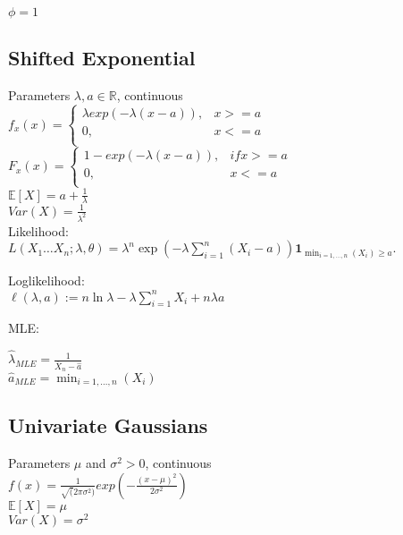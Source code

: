 $\phi = 1$


\subsection*{Shifted Exponential}

Parameters $\lambda, a \in \mathbb{R}$, continuous\\
$ f_x(x)=
	\begin{cases}
		 \lambda exp(-\lambda(x - a )),&{x >= a}\\
		0,&{x <= a}\\
	\end{cases}
$\\

$ F_x(x)=
	\begin{cases}
		 1-exp(-\lambda(x-a)),&{if x >= a}\\
		0,&{x <= a}\\
	\end{cases}
$\\

$\mathbb{E}[X]=a + \frac{1}{\lambda}$\\

$Var(X)=\frac{1}{\lambda^2}$\\

Likelihood:\\

$L(X_1\dots X_n;\lambda,\theta)= \lambda ^ n \exp \left( -\lambda \sum _{i = 1}^ n (X_ i - a) \right) \mathbf{1}_{\min _{i = 1, \ldots , n}(X_ i) \geq a}.$

Loglikelihood:\\

$\ell (\lambda , a) := n \ln \lambda - \lambda \sum _{i = 1}^ n X_ i + n \lambda a$

MLE:

$\hat{\lambda }_{MLE} = \frac{1}{\overline{X}_ n - \hat{a}}$\\

$\hat{a}_{MLE} = \min _{i =1, \ldots , n}(X_ i)$

\subsection*{Univariate Gaussians}
Parameters $\mu$ and $\sigma^2 >0$, continuous\\
$f(x)= \frac{1}{\sqrt(2 \pi \sigma^2)} exp(-\frac{(x-\mu)^2}{2\sigma^2})$ \\
$\mathbb{E}[X]=\mu$ \\
$Var(X)=\sigma^2$\\

